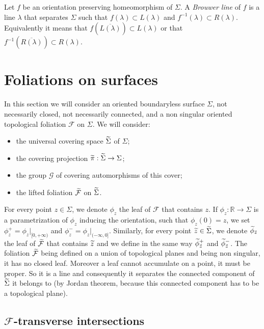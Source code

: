 \documentclass[10pt,a4paper]{article}
\theoremstyle{definition}
\theoremstyle{plain}
\numberwithin{equation}{section}
\numberwithin{figure}{section}
\newcommand{\R}{\mathbb{R}}
\newcommand{\G}{\mathcal{G}}
\newcommand{\F}{\mathcal{F}}
\let\oldtilde\tilde
\renewcommand*{\tilde}[1]{\mathchoice{\widetilde{#1}}{\widetilde{#1}}{\oldtilde{#1}}{\oldtilde{#1}}}
\begin{document}
Let $f$ be an orientation preserving homeomorphism of $\Sigma$. A \emph{Brouwer line} of $f$ is a line $\lambda$ that separates $\Sigma$ such that $f(\lambda)\subset L(\lambda)$ and $f^{-1}(\lambda)\subset R(\lambda)$. Equivalently it means that $f(\overline {L(\lambda)})\subset L(\lambda)$ or that $f^{-1}(\overline {R(\lambda)})\subset R(\lambda)$.


\section{Foliations on surfaces}\label{s.foliations}



In this section we will consider an oriented boundaryless surface $\Sigma$, not necessarily closed, not necessarily connected, and a non singular oriented topological foliation $\F$ on $\Sigma$. We will consider:
\begin{itemize}
\item the universal covering space $\tilde\Sigma$ of $\Sigma$;
\item the covering projection $\tilde\pi: \tilde\Sigma\to \Sigma$;
\item the group ${\G}$ of covering automorphisms of this cover;
\item the lifted foliation $\tilde{\F}$ on $\tilde{\Sigma}$.
\end{itemize}

For every point $z\in\Sigma$, we denote $\phi_{z}$ the leaf of $\F$ that contains $z$. If $\phi_z:\R\to\Sigma$ is a parametrization of $\phi_z$ inducing the orientation, such that $\phi_z(0)=z$, we set $\phi_z^+=\phi_z\vert_{[0,+\infty)}$ and $\phi_z^-=\phi_z\vert_{(-\infty,0]}$. Similarly, for every point $\tilde z\in\tilde\Sigma$, we denote $\tilde\phi_{\tilde z}$ the leaf of $\tilde{\F}$ that contains $\tilde z$ and we define in the same way $\tilde\phi_{\tilde z}^+$ and $\tilde\phi_{\tilde z}^-$. The foliation $\tilde{\F}$ being defined on a union of topological planes and being non singular, it has no closed leaf. Moreover a leaf cannot accumulate on a point, it must be proper. So it is a line and consequently it separates the connected component of $\tilde{\Sigma}$ it belongs to (by Jordan theorem, because this connected component has to be a topological plane).



\subsection{\texorpdfstring{$\F$}{F}-transverse intersections}\label{ss.intersections}
\end{document}
